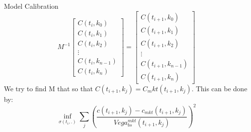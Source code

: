 \documentclass[10pt,table,mathserif]{beamer}
\begin{document}
\begin{frame}{Model Calibration}
\[M^{-1}\begin{bmatrix}
C(t_{i},k_0)\\
C(t_{i},k_1)\\
C(t_{i},k_2)\\
\vdots\\
C(t_{i},k_{n-1}) \\
C(t_{i},k_{n})
\end{bmatrix}=
\begin{bmatrix}
C(t_{i+1},k_0)\\
C(t_{i+1},k_1)\\
C(t_{i+1},k_2)\\
\vdots\\
C(t_{i+1},k_{n-1}) \\
C(t_{i+1},k_{n})
\end{bmatrix}
\]
We try to find M that so that $C(t_{i+1},k_j)=C_mkt(t_{i+1},k_j)$. This can be done by:
\[
\inf_{\sigma(t_i,.)} \sum_{j}(\frac{c(t_{i+1},k_j)-c_{mkt}(t_{i+1},k_j)}{Vega_{bs}^{mkt}(t_{i+1},k_j)})^2
\]
\end{frame}
 
\end{document}
